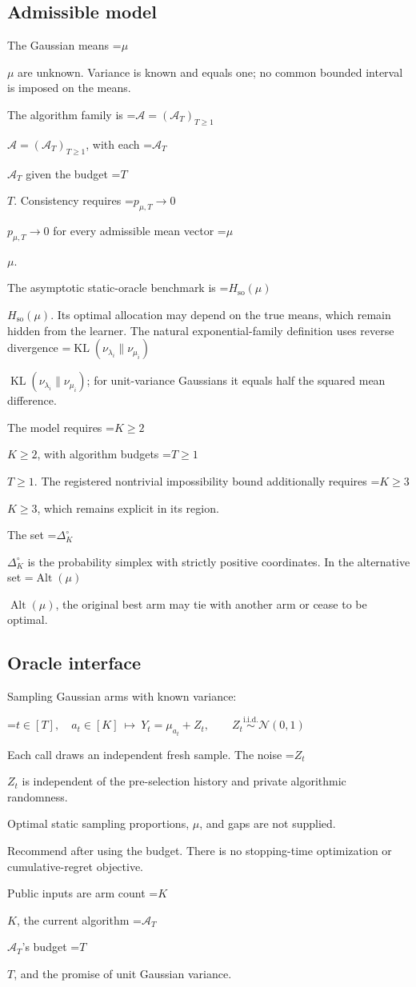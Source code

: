 \documentclass[10pt,a4paper]{article}
\newcommand{\AtlasMath}[1]{\par\begingroup\centering\setbox0=\hbox{$\displaystyle #1$}\ifdim\wd0>1.4\linewidth\typeout{ATLAS WIDE FORMULA: \the\wd0}\fi\ifdim\wd0>\linewidth\resizebox{\linewidth}{!}{\box0}\else\box0\fi\par\endgroup}
\newcommand{\AtlasInlineMath}[1]{\begingroup\setbox0=\hbox{$#1$}\ifdim\wd0>.4\linewidth\endgroup\AtlasMath{#1}\else\endgroup$#1$\fi}
\begin{document}
\subsection{Admissible model}
The Gaussian means \AtlasInlineMath{\mu} are unknown. Variance is known and equals one; no common bounded interval is imposed on the means.

The algorithm family is \AtlasInlineMath{\mathcal{A}=(\mathcal{A}_T)_{T\ge1}}, with each \AtlasInlineMath{\mathcal{A}_T} given the budget \AtlasInlineMath{T}. Consistency requires \AtlasInlineMath{p_{\mu,T}\to0} for every admissible mean vector \AtlasInlineMath{\mu}.

The asymptotic static-oracle benchmark is \AtlasInlineMath{H_{\mathrm{so}}(\mu)}. Its optimal allocation may depend on the true means, which remain hidden from the learner. The natural exponential-family definition uses reverse divergence \AtlasInlineMath{\operatorname{KL}(\nu_{\lambda_i}\|\nu_{\mu_i})}; for unit-variance Gaussians it equals half the squared mean difference.

The model requires \AtlasInlineMath{K\ge2}, with algorithm budgets \AtlasInlineMath{T\ge1}. The registered nontrivial impossibility bound additionally requires \AtlasInlineMath{K\ge3}, which remains explicit in its region.

The set \AtlasInlineMath{\Delta_K^\circ} is the probability simplex with strictly positive coordinates. In the alternative set \AtlasInlineMath{\operatorname{Alt}(\mu)}, the original best arm may tie with another arm or cease to be optimal.

\subsection{Oracle interface}
Sampling Gaussian arms with known variance:


\AtlasMath{t\in[T],\quad a_t\in[K]\ \longmapsto\ Y_t=\mu_{a_t}+Z_t,\qquad Z_t\overset{\mathrm{i.i.d.}}\sim\mathcal{N}(0,1)}


Each call draws an independent fresh sample. The noise \AtlasInlineMath{Z_t} is independent of the pre-selection history and private algorithmic randomness.

Optimal static sampling proportions, $\mu$, and gaps are not supplied.

Recommend after using the budget. There is no stopping-time optimization or cumulative-regret objective.

Public inputs are arm count \AtlasInlineMath{K}, the current algorithm \AtlasInlineMath{\mathcal A_T}'s budget \AtlasInlineMath{T}, and the promise of unit Gaussian variance.
\end{document}
